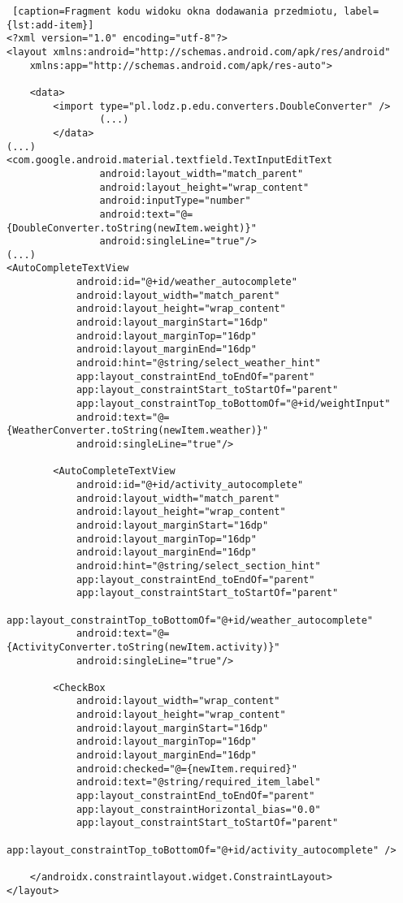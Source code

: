 \documentclass[a4paper,12pt]{article}
\begin{document}
\begin{lstlisting} [caption=Fragment kodu widoku okna dodawania przedmiotu, label={lst:add-item}]
<?xml version="1.0" encoding="utf-8"?>
<layout xmlns:android="http://schemas.android.com/apk/res/android"
    xmlns:app="http://schemas.android.com/apk/res-auto">

    <data>
        <import type="pl.lodz.p.edu.converters.DoubleConverter" />
				(...)
		</data>
(...)
<com.google.android.material.textfield.TextInputEditText
                android:layout_width="match_parent"
                android:layout_height="wrap_content"
                android:inputType="number"
                android:text="@={DoubleConverter.toString(newItem.weight)}"
                android:singleLine="true"/>
(...)
<AutoCompleteTextView
            android:id="@+id/weather_autocomplete"
            android:layout_width="match_parent"
            android:layout_height="wrap_content"
            android:layout_marginStart="16dp"
            android:layout_marginTop="16dp"
            android:layout_marginEnd="16dp"
            android:hint="@string/select_weather_hint"
            app:layout_constraintEnd_toEndOf="parent"
            app:layout_constraintStart_toStartOf="parent"
            app:layout_constraintTop_toBottomOf="@+id/weightInput"
            android:text="@={WeatherConverter.toString(newItem.weather)}"
            android:singleLine="true"/>

        <AutoCompleteTextView
            android:id="@+id/activity_autocomplete"
            android:layout_width="match_parent"
            android:layout_height="wrap_content"
            android:layout_marginStart="16dp"
            android:layout_marginTop="16dp"
            android:layout_marginEnd="16dp"
            android:hint="@string/select_section_hint"
            app:layout_constraintEnd_toEndOf="parent"
            app:layout_constraintStart_toStartOf="parent"
            app:layout_constraintTop_toBottomOf="@+id/weather_autocomplete"
            android:text="@={ActivityConverter.toString(newItem.activity)}"
            android:singleLine="true"/>

        <CheckBox
            android:layout_width="wrap_content"
            android:layout_height="wrap_content"
            android:layout_marginStart="16dp"
            android:layout_marginTop="16dp"
            android:layout_marginEnd="16dp"
            android:checked="@={newItem.required}"
            android:text="@string/required_item_label"
            app:layout_constraintEnd_toEndOf="parent"
            app:layout_constraintHorizontal_bias="0.0"
            app:layout_constraintStart_toStartOf="parent"
            app:layout_constraintTop_toBottomOf="@+id/activity_autocomplete" />

    </androidx.constraintlayout.widget.ConstraintLayout>
</layout>
\end{lstlisting}
\end{document}
